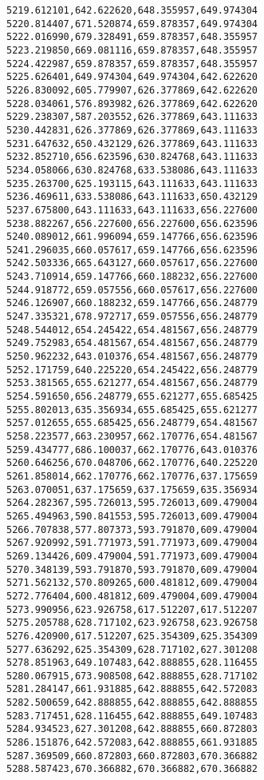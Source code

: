 \documentclass[11pt]{article}
\begin{document}
\begin{Verbatim}[commandchars=\\\{\}]
5219.612101,642.622620,648.355957,649.974304
5220.814407,671.520874,659.878357,649.974304
5222.016990,679.328491,659.878357,648.355957
5223.219850,669.081116,659.878357,648.355957
5224.422987,659.878357,659.878357,648.355957
5225.626401,649.974304,649.974304,642.622620
5226.830092,605.779907,626.377869,642.622620
5228.034061,576.893982,626.377869,642.622620
5229.238307,587.203552,626.377869,643.111633
5230.442831,626.377869,626.377869,643.111633
5231.647632,650.432129,626.377869,643.111633
5232.852710,656.623596,630.824768,643.111633
5234.058066,630.824768,633.538086,643.111633
5235.263700,625.193115,643.111633,643.111633
5236.469611,633.538086,643.111633,650.432129
5237.675800,643.111633,643.111633,656.227600
5238.882267,656.227600,656.227600,656.623596
5240.089012,661.996094,659.147766,656.623596
5241.296035,660.057617,659.147766,656.623596
5242.503336,665.643127,660.057617,656.227600
5243.710914,659.147766,660.188232,656.227600
5244.918772,659.057556,660.057617,656.227600
5246.126907,660.188232,659.147766,656.248779
5247.335321,678.972717,659.057556,656.248779
5248.544012,654.245422,654.481567,656.248779
5249.752983,654.481567,654.481567,656.248779
5250.962232,643.010376,654.481567,656.248779
5252.171759,640.225220,654.245422,656.248779
5253.381565,655.621277,654.481567,656.248779
5254.591650,656.248779,655.621277,655.685425
5255.802013,635.356934,655.685425,655.621277
5257.012655,655.685425,656.248779,654.481567
5258.223577,663.230957,662.170776,654.481567
5259.434777,686.100037,662.170776,643.010376
5260.646256,670.048706,662.170776,640.225220
5261.858014,662.170776,662.170776,637.175659
5263.070051,637.175659,637.175659,635.356934
5264.282367,595.726013,595.726013,609.479004
5265.494963,590.841553,595.726013,609.479004
5266.707838,577.807373,593.791870,609.479004
5267.920992,591.771973,591.771973,609.479004
5269.134426,609.479004,591.771973,609.479004
5270.348139,593.791870,593.791870,609.479004
5271.562132,570.809265,600.481812,609.479004
5272.776404,600.481812,609.479004,609.479004
5273.990956,623.926758,617.512207,617.512207
5275.205788,628.717102,623.926758,623.926758
5276.420900,617.512207,625.354309,625.354309
5277.636292,625.354309,628.717102,627.301208
5278.851963,649.107483,642.888855,628.116455
5280.067915,673.908508,642.888855,628.717102
5281.284147,661.931885,642.888855,642.572083
5282.500659,642.888855,642.888855,642.888855
5283.717451,628.116455,642.888855,649.107483
5284.934523,627.301208,642.888855,660.872803
5286.151876,642.572083,642.888855,661.931885
5287.369509,660.872803,660.872803,670.366882
5288.587423,670.366882,670.366882,670.366882

\end{Verbatim}
\end{document}
